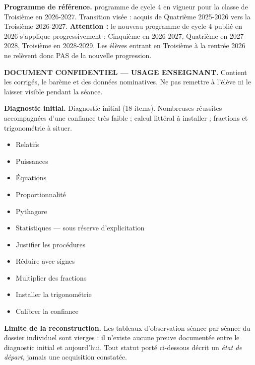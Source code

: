 \documentclass[10pt,a4paper]{article}
\begin{document}
\begin{methodbox}\small\textbf{Programme de référence.} programme de cycle 4 en vigueur pour la classe de Troisième en 2026-2027. Transition visée : acquis de Quatrième 2025-2026 vers la Troisième 2026-2027. \textbf{Attention :} le nouveau programme de cycle 4 publié en 2026 s'applique progressivement : Cinquième en 2026-2027, Quatrième en 2027-2028, Troisième en 2028-2029. Les élèves entrant en Troisième à la rentrée 2026 ne relèvent donc PAS de la nouvelle progression.\end{methodbox}
\begin{keybox}\textbf{DOCUMENT CONFIDENTIEL --- USAGE ENSEIGNANT.} Contient les corrigés, le barème et des données nominatives. Ne pas remettre à l'élève ni le laisser visible pendant la séance.\end{keybox}
\begin{methodbox}
\textbf{Diagnostic initial.} Diagnostic initial (18 items). Nombreuses réussites accompagnées d'une confiance très faible ; calcul littéral à installer ; fractions et trigonométrie à situer.
\end{methodbox}
\begin{itemize}\item Relatifs\item Puissances\item Équations\item Proportionnalité\item Pythagore\item Statistiques — sous réserve d'explicitation\end{itemize}
\begin{itemize}\item Justifier les procédures\item Réduire avec signes\item Multiplier des fractions\item Installer la trigonométrie\item Calibrer la confiance\end{itemize}
\begin{warningbox}\textbf{Limite de la reconstruction.} Les tableaux d'observation séance par séance du dossier individuel sont vierges : il n'existe aucune preuve documentée entre le diagnostic initial et aujourd'hui. Tout statut porté ci-dessous décrit un \emph{état de départ}, jamais une acquisition constatée.\end{warningbox}
\end{document}
